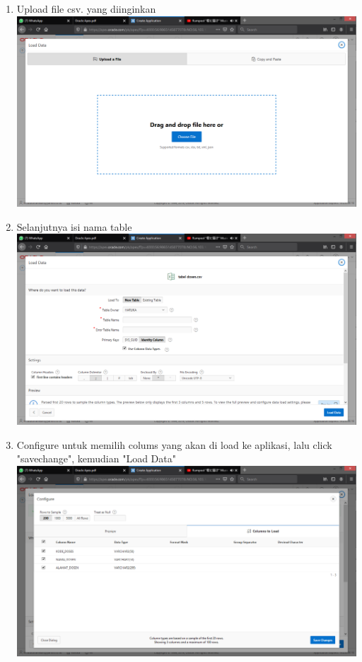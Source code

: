 \documentclass[12pt]{article}
\begin{document}
\begin{enumerate}
		\item Upload file csv. yang diinginkan\\
		\includegraphics[scale=0.3]{src/9}
		\item Selanjutnya isi nama table\\
		\includegraphics[scale=0.3]{src/10}
		\item Configure untuk memilih colums yang akan di load ke aplikasi, lalu click "savechange", kemudian "Load Data"\\
		\includegraphics[scale=0.3]{src/11}

\end{enumerate}
\end{document}

